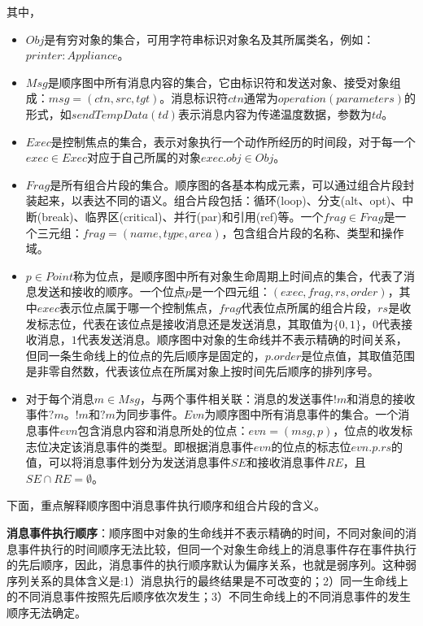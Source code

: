 	其中，
	\begin{itemize}
	\item $Obj$是有穷对象的集合，可用字符串标识对象名及其所属类名，例如：$printer:Appliance$。
	\item $Msg$是顺序图中所有消息内容的集合，它由标识符和发送对象、接受对象组成：$msg=(ctn,src,tgt)$。消息标识符$ctn$通常为$operation(parameters)$的形式，如$sendTempData(td)$表示消息内容为传递温度数据，参数为$td$。
	\item $Exec$是控制焦点的集合，表示对象执行一个动作所经历的时间段，对于每一个$exec\in Exec$对应于自己所属的对象$exec.obj\in Obj$。
	\item $Frag$是所有组合片段的集合。顺序图的各基本构成元素，可以通过组合片段封装起来，以表达不同的语义。组合片段包括：循环(loop)、分支(alt、opt)、中断(break)、临界区(critical)、并行(par)和引用(ref)等。一个$frag\in Frag$是一个三元组：$frag=(name,type,area)$，包含组合片段的名称、类型和操作域。
	\item $p \in Point$称为位点，是顺序图中所有对象生命周期上时间点的集合，代表了消息发送和接收的顺序。一个位点$p$是一个四元组：$(exec,frag,rs,order)$，其中$exec$表示位点属于哪一个控制焦点，$frag$代表位点所属的组合片段，$rs$是收发标志位，代表在该位点是接收消息还是发送消息，其取值为$\{0,1\}$，$0$代表接收消息，$1$代表发送消息。顺序图中对象的生命线并不表示精确的时间关系，但同一条生命线上的位点的先后顺序是固定的，$p.order$是位点值，其取值范围是非零自然数，代表该位点在所属对象上按时间先后顺序的排列序号。
	\item 对于每个消息$m\in Msg$，与两个事件相关联：消息的发送事件$!m$和消息的接收事件$?m$。$!m$和$?m$为同步事件。$Evn$为顺序图中所有消息事件的集合。一个消息事件$evn$包含消息内容和消息所处的位点：$evn=(msg,p)$，位点的收发标志位决定该消息事件的类型。即根据消息事件$evn$的位点的标志位$evn.p.rs$的值，可以将消息事件划分为发送消息事件$SE$和接收消息事件$RE$，且$SE \cap RE = \emptyset$。
	\end{itemize}
	
	下面，重点解释顺序图中消息事件执行顺序和组合片段的含义。
	
	\textbf{消息事件执行顺序}：顺序图中对象的生命线并不表示精确的时间，不同对象间的消息事件执行的时间顺序无法比较，但同一个对象生命线上的消息事件存在事件执行的先后顺序，因此，消息事件的执行顺序默认为偏序关系，也就是弱序列。这种弱序列关系的具体含义是:1）消息执行的最终结果是不可改变的；2）同一生命线上的不同消息事件按照先后顺序依次发生；3）不同生命线上的不同消息事件的发生顺序无法确定。
	
